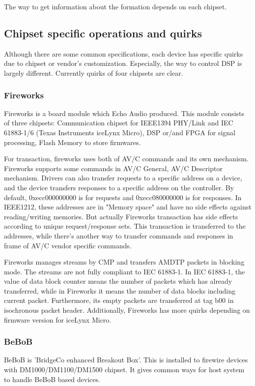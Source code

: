 \documentclass[onecolumn]{article}
\begin{document}
The way to get information about the formation depends on each chipset.

\subsection{Chipset specific operations and quirks}

Although there are some common specifications, each device has specific quirks due to chipset or vendor's customization. Especially, the way to control DSP is largely different. Currently quirks of four chipsets are clear.

\subsubsection{Fireworks}
Fireworks is a board module which Echo Audio produced. This module consists of three chipsets: Communication chipset for IEEE1394 PHY/Link and IEC 61883-1/6 (Texas Instruments iceLynx Micro), DSP or/and FPGA for signal processing, Flash Memory to store firmwares.

For transaction, fireworks uses both of AV/C commands and its own mechanism. Fireworks supports some commands in AV/C General\cite{avc-general-4-2}, AV/C Descriptor mechanism\cite{avc-general-enhancement}. Drivers can also transfer requests to a specific address on a device, and the device transfers responses to a specific address on the controller. By default, 0xecc000000000 is for requests and 0xecc080000000 is for responses. In IEEE1212, these addresses are in "Memory space" and have no side effects against reading/writing memories. But actually Fireworks transaction has side effects according to unique request/response sets. This transaction is transferred to the addresses, while there's another way to transfer commands and responses in frame of AV/C vendor specific commands.

Fireworks manages streams by CMP and transfers AMDTP packets in blocking mode. The streams are not fully compliant to IEC 61883-1. In IEC 61883-1, the value of data block counter means the number of packets which has already transferred, while in Fireworks it means the number of data blocks including current packet. Furthermore, its empty packets are transferred at tag b00 in isochronous packet header. Additionally, Fireworks has more quirks depending on firmware version for iceLynx Micro.


\subsubsection{BeBoB}
BeBoB is 'BridgeCo enhanced Breakout Box'. This is installed to firewire devices with DM1000/DM1100/DM1500 chipset. It gives common ways for host system to handle BeBoB based devices.
\end{document}
